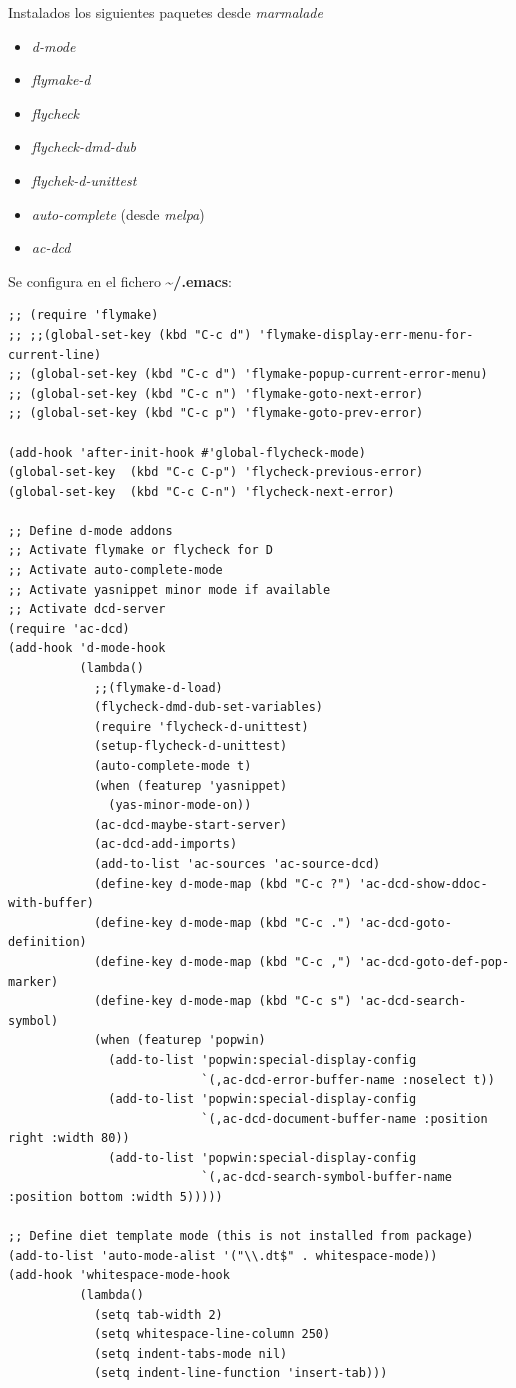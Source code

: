 \documentclass[12pt,spanish,]{scrartcl}
\providecommand{\tightlist}{%
  \setlength{\itemsep}{0pt}\setlength{\parskip}{0pt}}
\begin{document}
Instalados los siguientes paquetes desde \emph{marmalade}

\begin{itemize}
\tightlist
\item
  \emph{d-mode}
\item
  \emph{flymake-d}
\item
  \emph{flycheck}
\item
  \emph{flycheck-dmd-dub}
\item
  \emph{flychek-d-unittest}
\item
  \emph{auto-complete} (desde \emph{melpa})
\item
  \emph{ac-dcd}
\end{itemize}

Se configura en el fichero \textbf{\textasciitilde{}/.emacs}:

\begin{verbatim}
;; (require 'flymake)
;; ;;(global-set-key (kbd "C-c d") 'flymake-display-err-menu-for-current-line)
;; (global-set-key (kbd "C-c d") 'flymake-popup-current-error-menu)
;; (global-set-key (kbd "C-c n") 'flymake-goto-next-error)
;; (global-set-key (kbd "C-c p") 'flymake-goto-prev-error)

(add-hook 'after-init-hook #'global-flycheck-mode)
(global-set-key  (kbd "C-c C-p") 'flycheck-previous-error)
(global-set-key  (kbd "C-c C-n") 'flycheck-next-error)

;; Define d-mode addons
;; Activate flymake or flycheck for D
;; Activate auto-complete-mode
;; Activate yasnippet minor mode if available
;; Activate dcd-server
(require 'ac-dcd)
(add-hook 'd-mode-hook
          (lambda()
            ;;(flymake-d-load)
            (flycheck-dmd-dub-set-variables)
            (require 'flycheck-d-unittest)
            (setup-flycheck-d-unittest)
            (auto-complete-mode t)
            (when (featurep 'yasnippet)
              (yas-minor-mode-on))
            (ac-dcd-maybe-start-server)
            (ac-dcd-add-imports)
            (add-to-list 'ac-sources 'ac-source-dcd)
            (define-key d-mode-map (kbd "C-c ?") 'ac-dcd-show-ddoc-with-buffer)
            (define-key d-mode-map (kbd "C-c .") 'ac-dcd-goto-definition)
            (define-key d-mode-map (kbd "C-c ,") 'ac-dcd-goto-def-pop-marker)
            (define-key d-mode-map (kbd "C-c s") 'ac-dcd-search-symbol)
            (when (featurep 'popwin)
              (add-to-list 'popwin:special-display-config
                           `(,ac-dcd-error-buffer-name :noselect t))
              (add-to-list 'popwin:special-display-config
                           `(,ac-dcd-document-buffer-name :position right :width 80))
              (add-to-list 'popwin:special-display-config
                           `(,ac-dcd-search-symbol-buffer-name :position bottom :width 5)))))

;; Define diet template mode (this is not installed from package)
(add-to-list 'auto-mode-alist '("\\.dt$" . whitespace-mode))
(add-hook 'whitespace-mode-hook
          (lambda()
            (setq tab-width 2)
            (setq whitespace-line-column 250)
            (setq indent-tabs-mode nil)
            (setq indent-line-function 'insert-tab)))
\end{verbatim}
\end{document}
